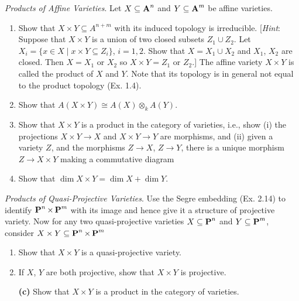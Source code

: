 \documentclass[10pt]{amsart}
\begin{document}
\begin{exercise}[3.15]
    \emph{Products of Affine Varieties}. Let $X \subseteq \aa^n$ and $Y \subseteq \aa^m$ be affine varieties.
    \begin{enumerate}[itemsep=1pt]
        \item Show that $X \times Y \subseteq A^{n+m}$ with its induced topology is irreducible. 
        [\emph{Hint}: Suppose that $X \times Y$ is a union of two closed subsets $Z_1 \cup Z_2$. Let 
        $X_i = \{x \in X \mid x \times Y \subseteq Z_i\}$, $i = 1,2$. 
        Show that $X = X_1 \cup X_2$ and $X_1$, $X_2$ are closed. Then $X = X_1$ or $X_2$ so $X \times Y = Z_1$ or $Z_2$.] 
        The affine variety $X \times Y$ is called the product of $X$ and $Y$. Note that its topology is in general
        not equal to the product topology (Ex. 1.4).
        \item Show that $A(X \times Y) \cong A(X) \otimes_k A(Y)$.
        \item Show that $X \times Y$ is a product in the category of varieties, i.e., show (i) the
        projections $X \times Y \to X$ and $X \times Y \to Y$ are morphisms, and (ii) given a variety $Z$, 
        and the morphisms $Z \to X$, $Z \to Y$, there is a unique morphism $Z \to X \times Y$ making a commutative 
        diagram 
        \begin{center}
        \end{center}

        \item Show that $\dim X \times Y = \dim X + \dim Y$.
    \end{enumerate}
\end{exercise}


\begin{exercise}[3.16]
    \emph{Products of Quasi-Projective Varieties}. Use the Segre embedding (Ex. 2.14) to identify $\pp^n \times \pp^m$ 
    with its image and hence give it a structure of projective variety. Now for any two quasi-projective varieties 
    $X \subseteq \pp^n$ and $Y \subseteq \pp^m$, consider $X \times Y \subseteq \pp^n \times \pp^m$
    \begin{enumerate}[itemsep=1pt]
        \item Show that $X \times Y$ is a quasi-projective variety.
        \item If $X$, $Y$ are both projective, show that $X \times Y$ is projective.
        \item[{\bf *(c)}] Show that $X \times Y$ is a product in the category of varieties.
    \end{enumerate}
\end{exercise}
\end{document}
